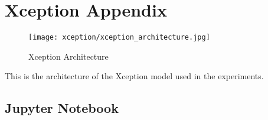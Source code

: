 \section{Xception Appendix}\label{s:xception_appendix}

\begin{figure}[H]
  \begin{center}
    \texttt{[image: xception/xception\_architecture.jpg]}
  \end{center}
  \caption{Xception Architecture}\label{f:xception_arh}
\end{figure}

This is the architecture of the Xception model used in the experiments.

\subsection{Jupyter Notebook}

